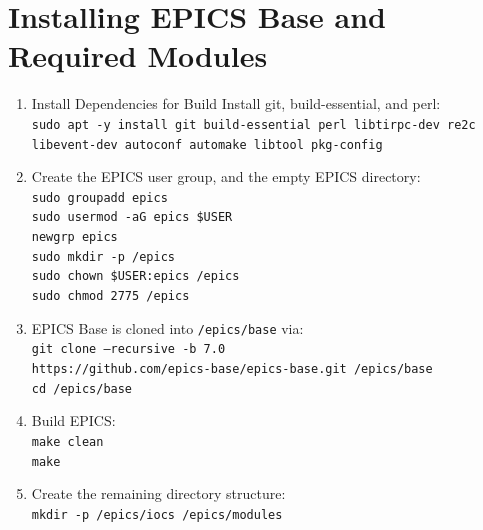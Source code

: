 \section{Installing EPICS Base and Required Modules}
	\begin{enumerate}
		\item Install Dependencies for Build
			\hspace*{2em} Install git, build-essential, and perl:\\ \texttt{sudo apt -y install git build-essential perl libtirpc-dev re2c libevent-dev autoconf automake libtool pkg-config}
		\item Create the EPICS user group, and the empty EPICS directory: \\
			\hspace*{2em} \texttt{sudo groupadd epics}\\
			\hspace*{2em} \texttt{sudo usermod -aG epics \$USER}\\
			\hspace*{2em} \texttt{newgrp epics}\\
			\hspace*{2em} \texttt{sudo mkdir -p /epics}\\
			\hspace*{2em} \texttt{sudo chown \$USER:epics /epics}\\
			\hspace*{2em} \texttt{sudo chmod 2775 /epics}\\
		\item EPICS Base is cloned into \texttt{/epics/base} via:\\
			\hspace*{2em} \texttt{git clone --recursive -b 7.0} \\ \hspace*{4em}\texttt{https://github.com/epics-base/epics-base.git /epics/base}\\
			\hspace*{2em} \texttt{cd /epics/base}\\
		\item Build EPICS:\\
			\hspace*{2em} \texttt{make clean}\\
			\hspace*{2em} \texttt{make}\\

		\item Create the remaining directory structure:\\
			\hspace*{2em} \texttt{mkdir -p /epics/iocs /epics/modules}\\


\end{enumerate}
